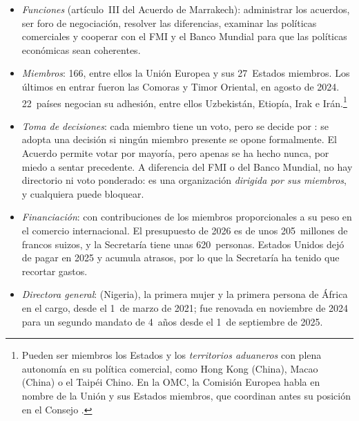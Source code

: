 \documentclass[11pt]{article}
\begin{document}
\begin{itemize}
\item \emph{Funciones} (artículo~III del Acuerdo de Marrakech): administrar los acuerdos, ser foro de negociación, resolver las diferencias, examinar las políticas comerciales y cooperar con el FMI y el Banco Mundial para que las políticas económicas sean coherentes.
\item \emph{Miembros}: 166, entre ellos la Unión Europea y sus 27~Estados miembros. Los últimos en entrar fueron las Comoras y Timor Oriental, en agosto de 2024. 22~países negocian su adhesión, entre ellos Uzbekistán, Etiopía, Irak e Irán\nocite{OMC2026Miembros,OMC2026Adhesiones}.\footnote{Pueden ser miembros los Estados y los \emph{territorios aduaneros} con plena autonomía en su política comercial, como Hong Kong (China), Macao (China) o el Taipéi Chino. En la OMC, la Comisión Europea habla en nombre de la Unión y sus Estados miembros, que coordinan antes su posición en el Consejo .}
\item \emph{Toma de decisiones}: cada miembro tiene un voto, pero se decide por : se adopta una decisión si ningún miembro presente se opone formalmente. El Acuerdo permite votar por mayoría, pero apenas se ha hecho nunca, por miedo a sentar precedente. A diferencia del FMI o del Banco Mundial, no hay directorio ni voto ponderado: es una organización \emph{dirigida por sus miembros}, y cualquiera puede bloquear.
\item \emph{Financiación}: con contribuciones de los miembros proporcionales a su peso en el comercio internacional. El presupuesto de 2026 es de unos 205~millones de francos suizos, y la Secretaría tiene unas 620~personas. Estados Unidos dejó de pagar en 2025 y acumula atrasos, por lo que la Secretaría ha tenido que recortar gastos\nocite{OMC2026Secretaria}.
\item \emph{Directora general}:  (Nigeria), la primera mujer y la primera persona de África en el cargo, desde el 1~de marzo de 2021; fue renovada en noviembre de 2024 para un segundo mandato de 4~años desde el 1~de septiembre de 2025\nocite{OMC2026DG}.
\end{itemize}
\end{document}
